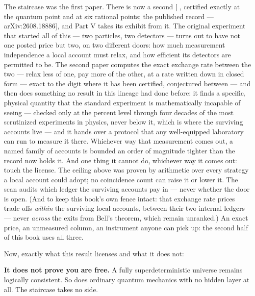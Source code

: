 \begin{ruled}

The staircase was the first paper. There is now a second {[}
, certified exactly at the quantum point and at six rational
points; the published record --- arXiv:2608.18886{]}, and Part V takes
its exhibit from it. The original experiment that
started all of this --- two particles, two detectors --- turns out to have
not one posted price but two, on two different doors: how much
measurement independence a local account must relax, and how
efficient its detectors are permitted to be. The second paper computes
the exact exchange rate between the two --- relax less of one, pay
more of the other, at a rate written down in closed form --- exact to the digit where it has been certified, conjectured between --- and then
does something no result in this lineage had done before: it finds a
specific, physical quantity that the standard experiment is
mathematically incapable of seeing --- checked only at the percent level
through four decades of the most scrutinized experiments in physics,
never below it, which is where the surviving accounts live --- and it
hands over a protocol that any well-equipped laboratory can run to
measure it there. Whichever way that measurement comes out, a named
family of accounts is bounded an order of magnitude tighter than the
record now holds it. And one thing it cannot do, whichever way it
comes out: touch the license. The ceiling above was proven by
arithmetic over every strategy a local account could adopt; no
coincidence count can raise it or lower it. The scan audits which
ledger the surviving accounts pay in --- never whether the door is
open. (And to keep this book's own fence intact: that exchange rate
prices trade-offs \emph{within} the surviving local accounts, between their
two internal ledgers --- never \emph{across} the exits from Bell's theorem,
which remain unranked.) An exact price, an unmeasured column, an
instrument anyone can pick up: the second half of this book uses all
three.

\end{ruled}

Now, exactly what this result licenses and what it does not:

\textbf{It does not prove you are free.} A fully superdeterministic universe
remains logically consistent. So does ordinary quantum mechanics with no
hidden layer at all. The staircase takes no side.

